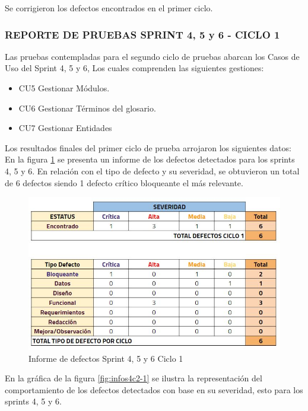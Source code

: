Se corrigieron los defectos encontrados en el primer ciclo.
\newpage

\subsubsection{REPORTE DE PRUEBAS SPRINT 4, 5 y 6 - CICLO 1}
Las pruebas contempladas para el segundo ciclo de pruebas abarcan los Casos de Uso del Sprint 4, 5 y 6, Los cuales comprenden las siguientes gestiones:

\begin{itemize}
	\item CU5 Gestionar Módulos.
	\item CU6 Gestionar Términos del glosario.
	\item CU7 Gestionar Entidades
\end{itemize}

Los resultados finales del primer ciclo de prueba arrojaron los siguientes datos:\\

En la figura \ref{fig:infos4c2} se presenta un informe de los defectos detectados para los sprints 4, 5 y 6. En relación con el tipo de defecto y su severidad, se obtuvieron un total de 6 defectos siendo 1 defecto crítico bloqueante el más relevante.

\begin{figure}[H]
	\begin{center}
		\includegraphics[width=.95\textwidth]{images/pruebas/s4c2}
		\caption{Informe de defectos Sprint 4, 5 y 6  Ciclo 1}
		\label{fig:infos4c2}
	\end{center}
\end{figure}

En la gráfica de la figura \ref{fig:infos4c2-1} se ilustra la representación del comportamiento de los defectos detectados con base en su severidad, esto para los sprints 4, 5 y 6.

